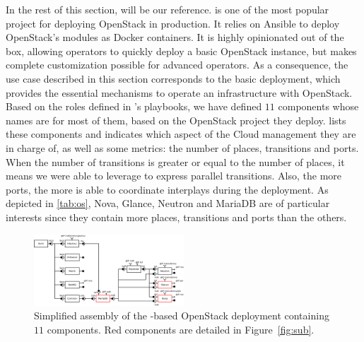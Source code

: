 \begin{table}
  \begin{center}
    
    \caption{Number of places, transitions, ports and roles for each \mad component
        of the OpenStack assembly of Figure~\ref{fig:full}.} \label{tab:os}
  \end{center}
\end{table}

In the rest of this section, \kolla will be our reference. \kolla is one of the
most popular project for deploying OpenStack in production. It relies on Ansible to
deploy OpenStack's modules as Docker containers. It is highly opinionated out of
the box, allowing operators to quickly deploy a basic OpenStack instance, but
makes complete customization possible for advanced operators. As a consequence,
the use case described in this section corresponds to the basic \kolla
deployment, which provides the essential mechanisms to operate an infrastructure
with OpenStack. Based on the roles defined in \kolla's playbooks, we have
defined $11$ \mad components whose names are for most of them, based on the
OpenStack project they deploy.  lists these components and
indicates which aspect of the Cloud management they are in charge of, as well as
some \mad metrics: the number of places, transitions and ports. When the number
of transitions is greater or equal to the number of places, it means we were
able to leverage \mad to express parallel transitions. Also, the more ports, the
more \mad is able to coordinate interplays during the deployment. As depicted in
\cref{tab:os}, Nova, Glance, Neutron and MariaDB are of particular interests
since they contain more places, transitions and ports than the others.

\begin{figure}
  \begin{center}
    \includegraphics[width=0.5\textwidth]{./images/full.pdf}
    \caption{Simplified \mad assembly of the \kolla-based OpenStack
    deployment containing $11$ components. Red components are detailed
    in Figure~\ref{fig:sub}.}
    \label{fig:full}
  \end{center}
\end{figure}

